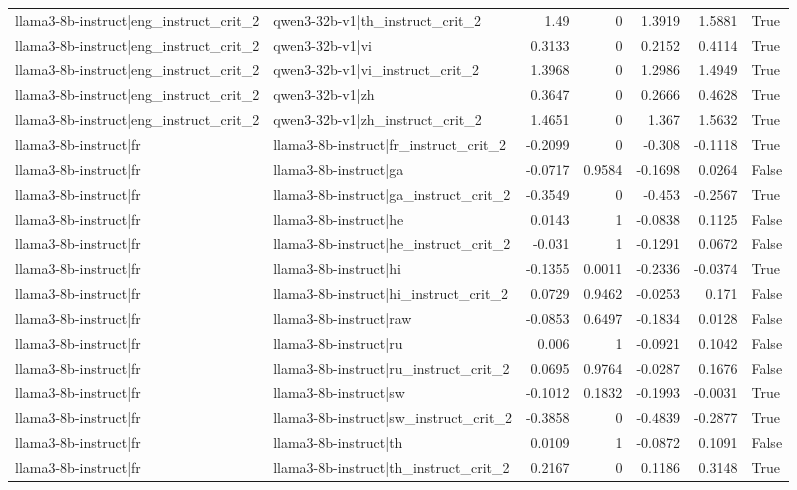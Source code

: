 \begin{table}
\begin{tabular}{l l r r r r l}
llama3-8b-instruct|eng_instruct_crit_2 & qwen3-32b-v1|th_instruct_crit_2 & 1.49 & 0 & 1.3919 & 1.5881 & True \\
llama3-8b-instruct|eng_instruct_crit_2 & qwen3-32b-v1|vi & 0.3133 & 0 & 0.2152 & 0.4114 & True \\
llama3-8b-instruct|eng_instruct_crit_2 & qwen3-32b-v1|vi_instruct_crit_2 & 1.3968 & 0 & 1.2986 & 1.4949 & True \\
llama3-8b-instruct|eng_instruct_crit_2 & qwen3-32b-v1|zh & 0.3647 & 0 & 0.2666 & 0.4628 & True \\
llama3-8b-instruct|eng_instruct_crit_2 & qwen3-32b-v1|zh_instruct_crit_2 & 1.4651 & 0 & 1.367 & 1.5632 & True \\
llama3-8b-instruct|fr & llama3-8b-instruct|fr_instruct_crit_2 & -0.2099 & 0 & -0.308 & -0.1118 & True \\
llama3-8b-instruct|fr & llama3-8b-instruct|ga & -0.0717 & 0.9584 & -0.1698 & 0.0264 & False \\
llama3-8b-instruct|fr & llama3-8b-instruct|ga_instruct_crit_2 & -0.3549 & 0 & -0.453 & -0.2567 & True \\
llama3-8b-instruct|fr & llama3-8b-instruct|he & 0.0143 & 1 & -0.0838 & 0.1125 & False \\
llama3-8b-instruct|fr & llama3-8b-instruct|he_instruct_crit_2 & -0.031 & 1 & -0.1291 & 0.0672 & False \\
llama3-8b-instruct|fr & llama3-8b-instruct|hi & -0.1355 & 0.0011 & -0.2336 & -0.0374 & True \\
llama3-8b-instruct|fr & llama3-8b-instruct|hi_instruct_crit_2 & 0.0729 & 0.9462 & -0.0253 & 0.171 & False \\
llama3-8b-instruct|fr & llama3-8b-instruct|raw & -0.0853 & 0.6497 & -0.1834 & 0.0128 & False \\
llama3-8b-instruct|fr & llama3-8b-instruct|ru & 0.006 & 1 & -0.0921 & 0.1042 & False \\
llama3-8b-instruct|fr & llama3-8b-instruct|ru_instruct_crit_2 & 0.0695 & 0.9764 & -0.0287 & 0.1676 & False \\
llama3-8b-instruct|fr & llama3-8b-instruct|sw & -0.1012 & 0.1832 & -0.1993 & -0.0031 & True \\
llama3-8b-instruct|fr & llama3-8b-instruct|sw_instruct_crit_2 & -0.3858 & 0 & -0.4839 & -0.2877 & True \\
llama3-8b-instruct|fr & llama3-8b-instruct|th & 0.0109 & 1 & -0.0872 & 0.1091 & False \\
llama3-8b-instruct|fr & llama3-8b-instruct|th_instruct_crit_2 & 0.2167 & 0 & 0.1186 & 0.3148 & True \\

\end{tabular}
\end{table}
